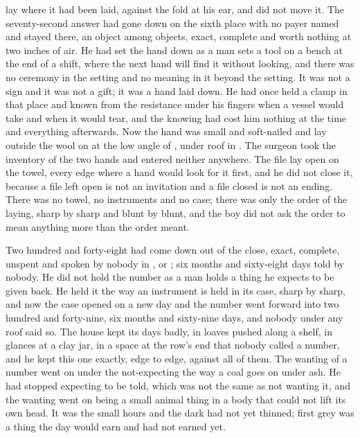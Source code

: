 
 lay where it had been laid, against the fold at his ear, and  did not move it. The seventy-second answer had gone down on the sixth place with no payer named and stayed there, an object among objects, exact, complete and worth nothing at two inches of air. He had set the hand down as a man sets a tool on a bench at the end of a shift, where the next hand will find it without looking, and there was no ceremony in the setting and no meaning in it beyond the setting. It was not a sign and it was not a gift; it was a hand laid down. He had once held a clamp in that place and known from the resistance under his fingers when a vessel would take and when it would tear, and the knowing had cost him nothing at the time and everything afterwards. Now the hand was small and soft-nailed and lay outside the wool on  at the low angle of , under  roof in . The surgeon took the inventory of the two hands and entered neither anywhere. The file lay open on the towel, every edge where a hand would look for it first, and he did not close it, because a file left open is not an invitation and a file closed is not an ending. There was no towel, no instruments and no case; there was only the order of the laying, sharp by sharp and blunt by blunt, and the boy did not ask the order to mean anything more than the order meant.

Two hundred and forty-eight had come down out of the close, exact, complete, unspent and spoken by nobody in ,  or ; six months and sixty-eight days told by nobody. He did not hold the number as a man holds a thing he expects to be given back. He held it the way an instrument is held in its case, sharp by sharp, and now the case opened on a new day and the number went forward into two hundred and forty-nine, six months and sixty-nine days, and nobody under any roof said so. The house kept its days badly, in loaves pushed along a shelf, in glances at a clay jar, in a space at the row's end that nobody called a number, and he kept this one exactly, edge to edge, against all of them. The wanting of a number went on under the not-expecting the way a coal goes on under ash. He had stopped expecting to be told, which was not the same as not wanting it, and the wanting went on being a small animal thing in a body that could not lift its own head. It was the small hours and the dark had not yet thinned; first grey was a thing the day would earn and had not earned yet.

